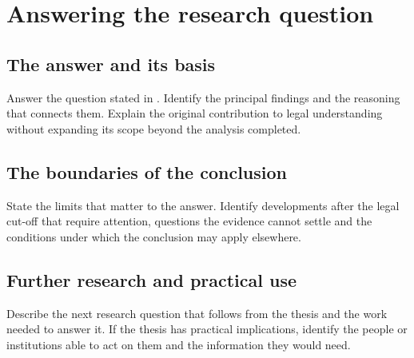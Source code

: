 \chapter{Answering the research question}\label{ch:conclusion}
\section{The answer and its basis}
Answer the question stated in . Identify the
principal findings and the reasoning that connects them. Explain the original
contribution to legal understanding without expanding its scope beyond the
analysis completed.

\section{The boundaries of the conclusion}
State the limits that matter to the answer. Identify developments after the
legal cut-off that require attention, questions the evidence cannot settle and
the conditions under which the conclusion may apply elsewhere.

\section{Further research and practical use}
Describe the next research question that follows from the thesis and the work
needed to answer it. If the thesis has practical implications, identify the
people or institutions able to act on them and the information they would need.

